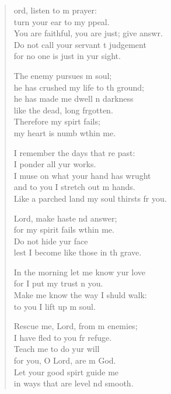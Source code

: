 \settowidth{\versewidth}{You are faithful, you are just; give answer. +}
\begin{verse}%
  \begin{patverse}
    ord, listen to m prayer:\Med\\
    turn your ear to my ppeal.\\
    You are faithful, you are just; give answr.\Flex\\
    Do not call your servant t judgement\Med\\
    for no one is just in yur sight.

    The enemy pursues m soul;\Med\\
    he has crushed my life to th ground;\\
    he has made me dwell \pointup{\i}n darkness\Med\\
    like the dead, long frgotten.\\
    Therefore my spir\pointup{\i}t fails;\Med\\
    my heart is numb w\pointup{\i}thin me.

    I remember the days that re past:\Med\\
    I ponder all yur works.\\
    I muse on what your hand has wrught\Flex\\
    and to you I stretch out m hands.\Med\\
    Like a parched land my soul thirsts fr you.

    Lord, make haste nd answer;\Med\\
    for my spirit fails w\pointup{\i}thin me.\\
    Do not hide yur face\Med\\
    lest I become like those in th grave.

    In the morning let me know yur love\Med\\
    for I put my trust \pointup{\i}n you.\\
    Make me know the way I shuld walk:\Med\\
    to you I lift up m soul.

    Rescue me, Lord, from m enemies;\Med\\
    I have fled to you fr refuge.\\
    Teach me to do yur will\Med\\
    for you, O Lord, are m God.\\
    Let your good spir\pointup{\i}t guide me\Med\\
    in ways that are level nd smooth.


\end{patverse}
\end{verse}
